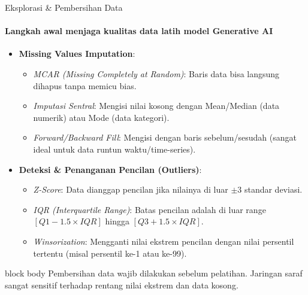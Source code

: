 \documentclass[aspectratio=169,t]{beamer}
\newcommand{\takeaway}[1]{%
  \vspace{0.1em}
  \begin{beamercolorbox}[rounded=true,shadow=false,sep=5pt]{block body}
    \centering\footnotesize\color{nvlightgreen}#1
  \end{beamercolorbox}%
}
\begin{document}
\begin{frame}{Eksplorasi \& Pembersihan Data}
  \framesubtitle{Langkah awal menjaga kualitas data latih model Generative AI}
  \begin{itemize}\footnotesize
    \item \textbf{Missing Values Imputation}:
      \begin{itemize}\scriptsize
        \item \emph{MCAR (Missing Completely at Random)}: Baris data bisa langsung dihapus tanpa memicu bias.
        \item \emph{Imputasi Sentral}: Mengisi nilai kosong dengan Mean/Median (data numerik) atau Mode (data kategori).
        \item \emph{Forward/Backward Fill}: Mengisi dengan baris sebelum/sesudah (sangat ideal untuk data runtun waktu/time-series).
      \end{itemize}
    \item \textbf{Deteksi \& Penanganan Pencilan (Outliers)}:
      \begin{itemize}\scriptsize
        \item \emph{Z-Score}: Data dianggap pencilan jika nilainya di luar $\pm 3$ standar deviasi.
        \item \emph{IQR (Interquartile Range)}: Batas pencilan adalah di luar range $[Q1 - 1.5 \times IQR]$ hingga $[Q3 + 1.5 \times IQR]$.
        \item \emph{Winsorization}: Mengganti nilai ekstrem pencilan dengan nilai persentil tertentu (misal persentil ke-1 atau ke-99).
      \end{itemize}
  \end{itemize}
  \takeaway{Pembersihan data wajib dilakukan sebelum pelatihan. Jaringan saraf sangat sensitif terhadap rentang nilai ekstrem dan data kosong.}
\end{frame}
\end{document}
